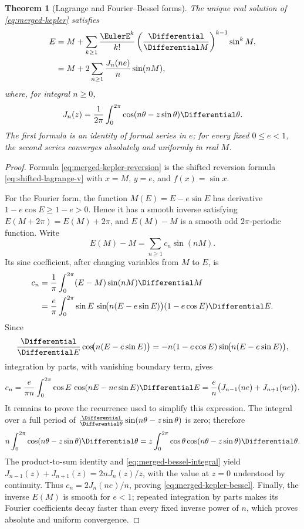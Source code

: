\documentclass[11pt,a4paper,oneside,openany]{book}
\newtheorem{theorem}{Theorem}[chapter]
\theoremstyle{definition}
\theoremstyle{remark}
\begin{document}
\begin{theorem}[Lagrange and Fourier--Bessel forms]
\label{thm:merged-kepler}
The unique real solution of \eqref{eq:merged-kepler} satisfies
\begin{align}
 E
 &=M+\sum_{k\geq1}\frac{\EulerE^k}{k!}
   \left(\frac{\Differential}{\Differential M}\right)^{k-1}\sin^k M,                  \label{eq:merged-kepler-reversion}\\
 &=M+2\sum_{n\geq1}\frac{J_n(ne)}{n}\sin(nM),                    \label{eq:merged-kepler-bessel}
\end{align}
where, for integral $n\geq0$,
\begin{equation}
 J_n(z)=\frac1{2\pi}\int_0^{2\pi}\cos(n\theta-z\sin\theta)\Differential\theta. \label{eq:merged-bessel-integral}
\end{equation}
The first formula is an identity of formal series in $e$; for every fixed
$0\leq e<1$, the second series converges absolutely and uniformly in real
$M$.
\end{theorem}

\begin{proof}
Formula \eqref{eq:merged-kepler-reversion} is the shifted reversion formula
\eqref{eq:shifted-lagrange-v} with $x=M$, $y=e$, and $f(x)=\sin x$.

For the Fourier form, the function $M(E)=E-e\sin E$ has derivative
$1-e\cos E\geq1-e>0$.  Hence it has a smooth inverse satisfying
$E(M+2\pi)=E(M)+2\pi$, and $E(M)-M$ is a smooth odd $2\pi$-periodic
function.  Write
\[
 E(M)-M=\sum_{n\geq1}c_n\sin(nM).
\]
Its sine coefficient, after changing variables from $M$ to $E$, is
\begin{align*}
 c_n
 &=\frac1\pi\int_0^{2\pi}(E-M)\sin(nM)\Differential M\\
 &=\frac e\pi\int_0^{2\pi}\sin E\,
   \sin\!\bigl(n(E-e\sin E)\bigr)(1-e\cos E)\Differential E.
\end{align*}
Since
\[
 \frac{\Differential}{\Differential E}\cos\!\bigl(n(E-e\sin E)\bigr)
 =-n(1-e\cos E)\sin\!\bigl(n(E-e\sin E)\bigr),
\]
integration by parts, with vanishing boundary term, gives
\[
 c_n=\frac e{\pi n}\int_0^{2\pi}\cos E\,
       \cos(nE-ne\sin E)\Differential E
 =\frac e n\bigl(J_{n-1}(ne)+J_{n+1}(ne)\bigr).
\]
It remains to prove the recurrence used to simplify this expression.  The
integral over a full period of
$\frac{\Differential}{\Differential\theta}\sin(n\theta-z\sin\theta)$ is zero; therefore
\[
 n\int_0^{2\pi}\cos(n\theta-z\sin\theta)\Differential\theta
 =z\int_0^{2\pi}\cos\theta\cos(n\theta-z\sin\theta)\Differential\theta.
\]
The product-to-sum identity and \eqref{eq:merged-bessel-integral} yield
$J_{n-1}(z)+J_{n+1}(z)=2nJ_n(z)/z$, with the value at $z=0$ understood by
continuity.  Thus $c_n=2J_n(ne)/n$, proving
\eqref{eq:merged-kepler-bessel}.  Finally, the inverse $E(M)$ is smooth for
$e<1$; repeated integration by parts makes its Fourier coefficients decay
faster than every fixed inverse power of $n$, which proves absolute and
uniform convergence.
\end{proof}
\end{document}
